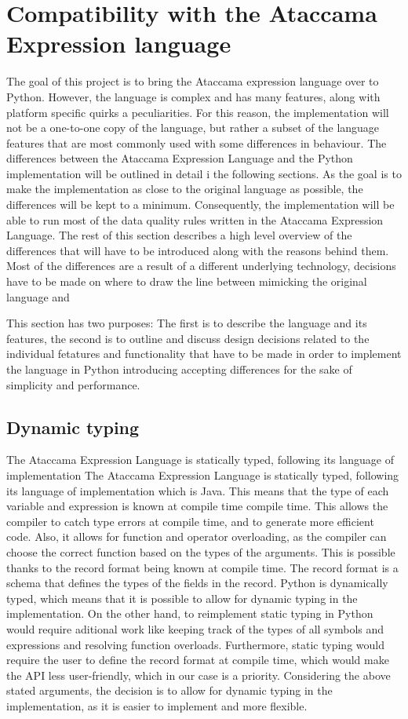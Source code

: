 \section{Compatibility with the Ataccama Expression language}


The goal of this project is to bring the Ataccama expression language over to
Python. However, the language is complex and has many features, along with
platform specific quirks a peculiarities. For this reason, the implementation will
not be a one-to-one copy of the language, but rather a subset of the language
features that are most commonly used with some differences in behaviour.
The differences between the Ataccama Expression Language and the Python
implementation will be outlined in detail i the following sections. As the goal
is to make the implementation as close to the original language as possible, the
differences will be kept to a minimum. Consequently, the implementation will be
able to run most of the data quality rules written in the Ataccama Expression
Language.
The rest of this section describes a high level overview of the differences that
will have to be introduced along with the reasons behind them. Most of the
differences are a result of a different underlying technology, decisions have to be
made on where to draw the line between mimicking the original language and

This section has two purposes: The first is to describe the language and its features, the second is to outline and discuss design decisions related to the individual fetatures and functionality that have to be made in order to implement the language in Python 
introducing accepting differences for the sake of simplicity and performance.

\subsection{Dynamic typing}

The Ataccama Expression Language is statically typed, following its language of implementation The Ataccama Expression Language is statically typed, following its language
of implementation which is Java. This means that the type of each variable and
expression is known at compile time compile time. This allows the compiler to
catch type errors at compile time, and to generate more efficient code. Also,
it allows for function and operator overloading, as the compiler can choose the
correct function based on the types of the arguments.
This is possible thanks to the record format being known at compile time. The
record format is a schema that defines the types of the fields in the record.
Python is dynamically typed, which means that it is possible to allow for
dynamic typing in the implementation.
On the other hand, to reimplement static typing in Python would require
aditional work like keeping track of the types of all symbols and expressions and
resolving function overloads.
Furthermore, static typing would require the user to define the record format
at compile time, which would make the API less user-friendly, which in our case
is a priority.
Considering the above stated arguments, the decision is to allow for dynamic
typing in the implementation, as it is easier to implement and more flexible.

